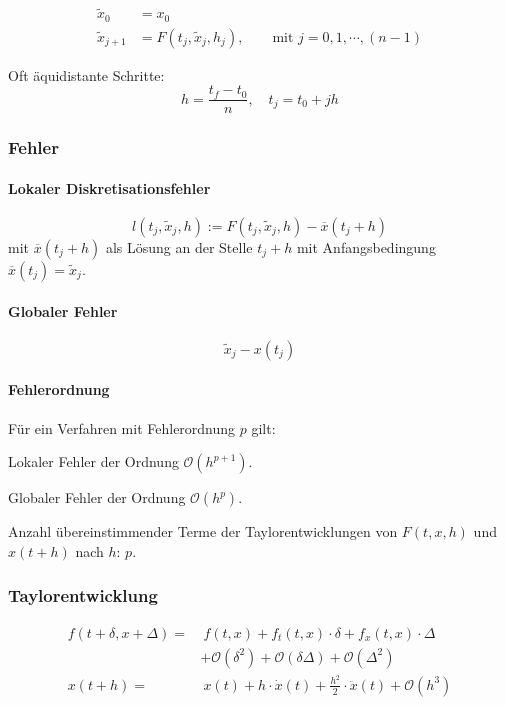 			\begin{algo}
				\begin{align*}
					\tilde x_0 &= x_0 \\
					\tilde x_{j+1} &= F(t_j,\tilde x_j, h_j), \qquad \text{mit } j=0,1,\cdots, (n-1) 
				\end{align*}
				
				Oft äquidistante Schritte:
				\[
					h=\frac{t_f-t_0}{n}, \quad t_j = t_0 + jh
				\]
			\end{algo}
			
		\subsubsection{Fehler} 
			\paragraph{Lokaler Diskretisationsfehler}
				\[
					l(t_j,\tilde x_j,h) := F(t_j,\tilde x_j, h)-\overline{x}(t_j+h)
				\]
				mit $\overline{x}(t_j+h)$ als Lösung an der Stelle $t_j+h$ mit Anfangsbedingung $\overline{x}(t_j)=\tilde x_j$. 
				
			\paragraph{Globaler Fehler}
				\[
					\tilde x_j - x(t_j)
				\]
				
			\paragraph{Fehlerordnung} Für ein Verfahren mit Fehlerordnung $p$ gilt: 
				\begin{tightitemize}
					\item Lokaler Fehler der Ordnung $\mathcal{O}\left(h^{p+1}\right)$. 
					\item Globaler Fehler der Ordnung $\mathcal{O}\left(h^{p}\right)$. 
					\item Anzahl übereinstimmender Terme der Taylorentwicklungen von $F(t,x,h)$ und $x(t+h)$ nach $h$: $p$. 
				\end{tightitemize}
				
		\subsubsection{Taylorentwicklung} 
			\begin{align*}
				f(t+\delta , x + \Delta) =&\: f(t,x) + f_t (t,x)\cdot \delta + f_x (t,x)\cdot \Delta \\
				& + \mathcal{O}(\delta^2) + \mathcal{O}(\delta \Delta) + \mathcal{O}(\Delta^2) \\
				x(t+h) =&\: x(t) + h \cdot \dot x(t) + \frac{h^2}{2} \cdot \ddot x(t) + \mathcal{O}(h^3)
			\end{align*}
			
